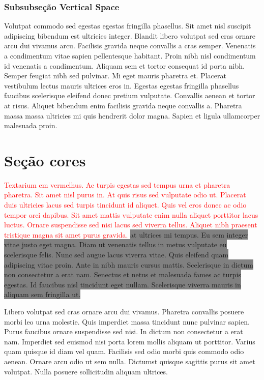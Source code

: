 \documentclass[12pt]{article}
\begin{document}
	\subsubsection{Subsubseção Vertical Space}
		\vspace{1.5cm} %
		Volutpat commodo sed egestas egestas fringilla phasellus. Sit amet nisl suscipit adipiscing bibendum est ultricies integer. Blandit libero volutpat sed cras ornare arcu dui vivamus arcu. Facilisis gravida neque convallis a cras semper. Venenatis a condimentum vitae sapien pellentesque habitant. Proin nibh nisl condimentum id venenatis a condimentum. Aliquam sem et tortor consequat id porta nibh. Semper feugiat nibh sed pulvinar. Mi eget mauris pharetra et. \vspace{1cm}Placerat vestibulum lectus mauris ultrices eros in. Egestas egestas fringilla phasellus faucibus scelerisque eleifend donec pretium vulputate. Convallis aenean et tortor at risus. Aliquet bibendum enim facilisis gravida neque convallis a. Pharetra massa massa ultricies mi quis hendrerit dolor magna. Sapien et ligula ullamcorper malesuada proin.
	\newpage	
	
	\section{Seção cores}
	\pagecolor{yellow} %
	\textcolor{red}{Textarium em vermelhus. Ac turpis egestas sed tempus urna et pharetra pharetra. Sit amet nisl purus in. At quis risus sed vulputate odio ut. Placerat duis ultricies lacus sed turpis tincidunt id aliquet. Quis vel eros donec ac odio tempor orci dapibus. Sit amet mattis vulputate enim nulla aliquet porttitor lacus luctus. Ornare suspendisse sed nisi lacus sed viverra tellus. Aliquet nibh praesent tristique magna sit amet purus gravida.} 
	\colorbox{gray}{ at ultrices mi tempus. Eu sem integer vitae justo eget magna. Diam ut venenatis tellus in metus vulputate eu scelerisque felis. Nunc sed augue lacus viverra vitae. Quis eleifend quam adipiscing vitae proin. Ante in nibh mauris cursus mattis. Scelerisque in dictum non consectetur a erat nam. Senectus et netus et malesuada fames ac turpis egestas. Id faucibus nisl tincidunt eget nullam. Scelerisque viverra mauris in aliquam sem fringilla ut.}
	
	\newpage
	
	Libero volutpat sed cras ornare arcu dui vivamus. Pharetra convallis posuere morbi leo urna molestie. Quis imperdiet massa tincidunt nunc pulvinar sapien. Purus faucibus ornare suspendisse sed nisi. In dictum non consectetur a erat nam. Imperdiet sed euismod nisi porta lorem mollis aliquam ut porttitor. Varius quam quisque id diam vel quam. Facilisis sed odio morbi quis commodo odio aenean. Ornare arcu odio ut sem nulla. Dictumst quisque sagittis purus sit amet volutpat. Nulla posuere sollicitudin aliquam ultrices.
	
\end{document}
